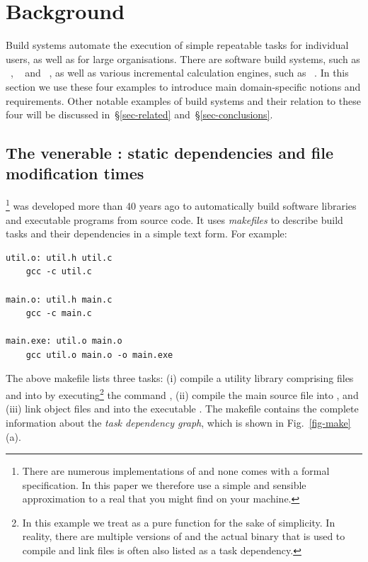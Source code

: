 \clearpage
\section{Background}\label{sec-background}

Build systems automate the execution of simple repeatable tasks for individual
users, as well as for large organisations. There are software build systems,
such as \Make~\cite{feldman1979make}, \Shake~\cite{mitchell2012shake} and
\Bazel~\cite{bazel}, as well as various incremental calculation engines, such
as \Excel~\cite{advanced_excel}. In this section we use these four examples to
introduce main domain-specific notions and requirements. Other notable examples
of build systems and their relation to these four will be discussed
in~\S\ref{sec-related} and~\S\ref{sec-conclusions}.

\subsection{The venerable \Make: static dependencies and file modification times}
\label{sec-background-make}

\Make\footnote{There are numerous implementations of \Make and none comes with a
formal specification. In this paper we therefore use a simple and sensible
approximation to a real \Make that you might find on your machine.} was developed
more than 40 years ago to automatically build software libraries and executable
programs from source code. It uses \emph{makefiles} to describe build tasks and
their dependencies in a simple text form. For example:

\vspace{1mm}
\begin{verbatim}
util.o: util.h util.c
    gcc -c util.c

main.o: util.h main.c
    gcc -c main.c

main.exe: util.o main.o
    gcc util.o main.o -o main.exe
\end{verbatim}
\vspace{1mm}

\noindent
The above makefile lists three tasks: (i) compile a utility library comprising
files  and  into  by
executing\footnote{In this example we treat  as a pure function for the
sake of simplicity. In reality, there are multiple versions of  and the
actual binary that is used to compile and link files is often also listed as a task
dependency.} the command , (ii) compile the main source file
 into , and (iii) link object files  and
 into the executable . The makefile contains the
complete information about the \emph{task dependency graph}, which is shown in
Fig.~\ref{fig-make}(a).

